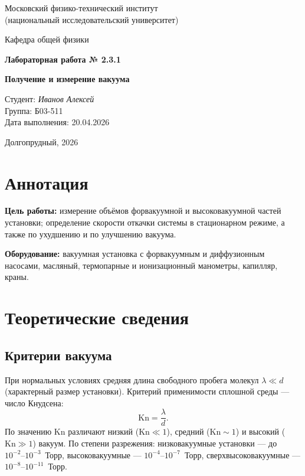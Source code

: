 \documentclass[12pt,a4paper]{article}
\begin{document}
\begin{titlepage}
    \centering
    \vspace*{2cm}
    {\Large Московский физико-технический институт\\[0.5ex]
    (национальный исследовательский университет)\par}
    \vspace{1cm}
    {\large Кафедра общей физики\par}
    \vspace{2cm}
    {\LARGE \textbf{Лабораторная работа № 2.3.1}\par}
    \vspace{1cm}
    {\huge \textbf{Получение и измерение вакуума}\par}
    \vspace{3cm}
    \begin{flushright}
        \large
        Студент: \textit{Иванов Алексей}\\
        Группа: Б03-511\\
        Дата выполнения: 20.04.2026
    \end{flushright}
    \vfill
    Долгопрудный, 2026
\end{titlepage}

\section*{Аннотация}
\textbf{Цель работы:} измерение объёмов форвакуумной и высоковакуумной частей установки; определение скорости откачки системы в стационарном режиме, а также по ухудшению и по улучшению вакуума.

\textbf{Оборудование:} вакуумная установка с форвакуумным и диффузионным насосами, масляный, термопарные и ионизационный манометры, капилляр, краны.


\section{Теоретические сведения}

\subsection{Критерии вакуума}
При нормальных условиях средняя длина свободного пробега молекул $\lambda \ll d$ (характерный размер установки). Критерий применимости сплошной среды — число Кнудсена:
\begin{equation}
    \mathrm{Kn} = \frac{\lambda}{d}.
\end{equation}
По значению $\mathrm{Kn}$ различают низкий ($\mathrm{Kn} \ll 1$), средний ($\mathrm{Kn} \sim 1$) и высокий ($\mathrm{Kn} \gg 1$) вакуум. По степени разрежения: низковакуумные установки — до $10^{-2}\text{--}10^{-3}$\ Торр, высоковакуумные — $10^{-4}\text{--}10^{-7}$\ Торр, сверхвысоковакуумные — $10^{-8}\text{--}10^{-11}$\ Торр.
\end{document}
